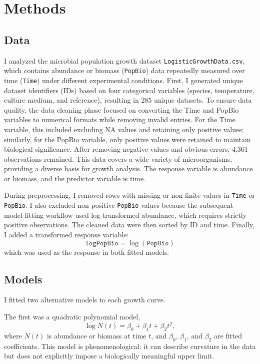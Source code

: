 \documentclass{article}
\begin{document}
\section{Methods}

\subsection{Data}
I analyzed the microbial population growth dataset \texttt{LogisticGrowthData.csv}, which contains abundance or biomass (\texttt{PopBio}) data repeatedly measured over time (\texttt{Time}) under different experimental conditions. First, I generated unique dataset identifiers (IDs) based on four categorical variables (species, temperature, culture medium, and reference), resulting in 285 unique datasets. To ensure data quality, the data cleaning phase focused on converting the Time and PopBio variables to numerical formats while removing invalid entries. For the Time variable, this included excluding NA values ​​and retaining only positive values; similarly, for the PopBio variable, only positive values ​​were retained to maintain biological significance. After removing negative values ​​and obvious errors, 4,361 observations remained. This data covers a wide variety of microorganisms, providing a diverse basis for growth analysis. The response variable is abundance or biomass, and the predictor variable is time.

During preprocessing, I removed rows with missing or non-finite values in \texttt{Time} or \texttt{PopBio}. I also excluded non-positive \texttt{PopBio} values because the subsequent model-fitting workflow used log-transformed abundance, which requires strictly positive observations. The cleaned data were then sorted by ID and time. Finally, I added a transformed response variable:
\[
\texttt{logPopBio} = \log(\texttt{PopBio})
\]
which was used as the response in both fitted models.

\subsection{Models}
I fitted two alternative models to each growth curve.

The first was a quadratic polynomial model,
\[
\log N(t) = \beta_0 + \beta_1 t + \beta_2 t^2 ,
\]
where \(N(t)\) is abundance or biomass at time \(t\), and \(\beta_0\), \(\beta_1\), and \(\beta_2\) are fitted coefficients. This model is phenomenological: it can describe curvature in the data but does not explicitly impose a biologically meaningful upper limit.
\end{document}
